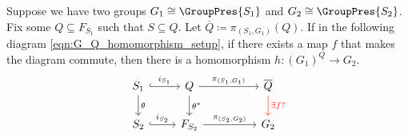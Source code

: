 \begin{theorem}
	Suppose we have two groups $G_1 \cong \GroupPres{S_1}$ and $G_2 \cong \GroupPres{S_2}$.
	Fix some $Q \subseteq F_{S_1}$ such that  $S \subseteq Q$.
	Let $\overline{Q} \coloneqq \pi_{(S_1, G_1)}(Q) $.
	If in the following diagram \eqref{eqn:G_Q_homomorphism_setup}, if there exists a map $f$ that makes the diagram commute, then there is a homomorphism $h \colon (G_1)^Q \to G_2$.
	\begin{equation}
		\begin{tikzcd}
			S_1 \ar[d, "\theta"] \ar[r, hook, "i_{S_1}"] & Q \ar[d, "\theta^*"] \ar[rr, "\pi_{(S_1,G_1)}"] & & \overline{Q} \ar[d, color=red, "\exists f ?"] \\
			S_2 \ar[r, hook, "i_{S_2}"] & F_{S_2} \ar[rr, "\pi_{(S_2,G_2)}"] & & G_2 
		\end{tikzcd}
		\label{eqn:G_Q_homomorphism_setup}
	\end{equation}
	\label{thm:G_Q_homomorphism}
\end{theorem}

